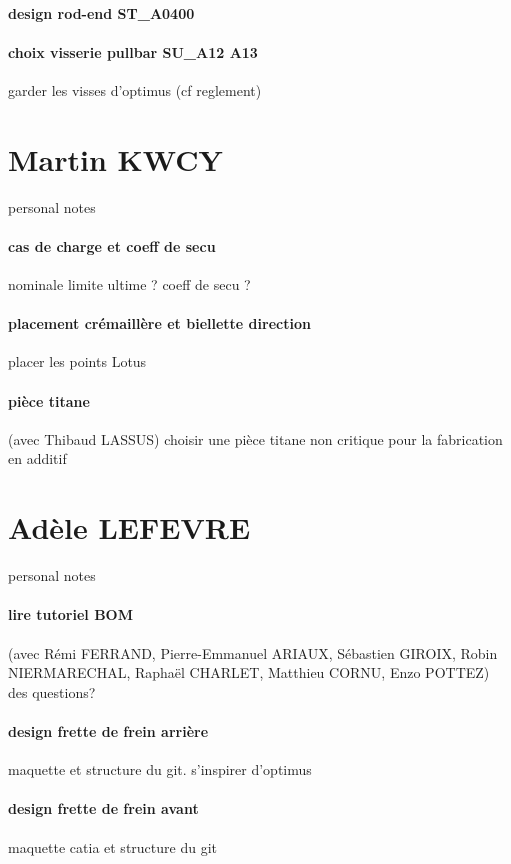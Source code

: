 \paragraph{design rod-end ST\_A0400} 
\paragraph{choix visserie pullbar SU\_A12 A13} garder les visses d'optimus (cf reglement)

 
 \newpage \section*{Martin KWCY} 
 \par personal notes
\paragraph{cas de charge et coeff de secu} nominale limite ultime ? coeff de secu ?
\paragraph{placement crémaillère et biellette direction} placer les points Lotus
\paragraph{pièce titane} (avec Thibaud LASSUS) choisir une pièce titane non critique pour la fabrication en additif

 
 \newpage \section*{Adèle LEFEVRE} 
 \par personal notes
\paragraph{lire tutoriel BOM} (avec Rémi FERRAND, Pierre-Emmanuel ARIAUX, Sébastien GIROIX, Robin NIERMARECHAL, Raphaël CHARLET, Matthieu CORNU, Enzo POTTEZ) des questions?
\paragraph{design frette de frein arrière} maquette et structure du git. s'inspirer d'optimus
\paragraph{design frette de frein avant} maquette catia et structure du git
